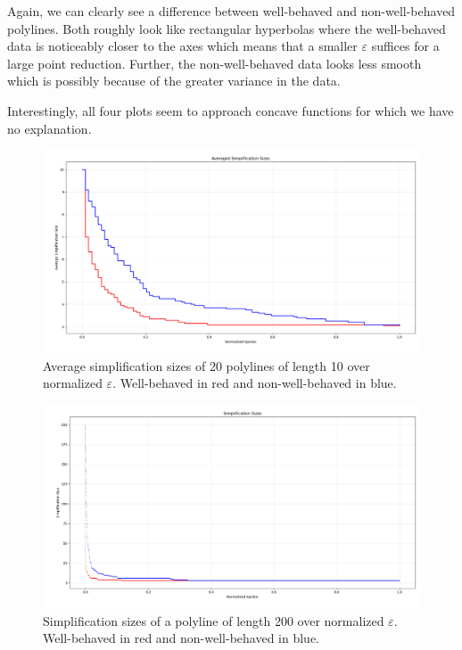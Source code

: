 Again, we can clearly see a difference between well-behaved and non-well-behaved polylines. Both roughly look like rectangular hyperbolas where the well-behaved data is noticeably closer to the axes which means that a smaller \(\varepsilon\) suffices for a large point reduction. Further, the non-well-behaved data looks less smooth which is possibly because of the greater variance in the data.

Interestingly, all four plots seem to approach concave functions for which we have no explanation.

\begin{figure}[b]
  \centering
	\includegraphics[scale=0.4]{./figures/vary_e10.png}
  \caption{Average simplification sizes of 20 polylines of length 10 over normalized \(\varepsilon\). Well-behaved in red and non-well-behaved in blue.}
  \label{fig:vary_e10}
\end{figure}

\begin{figure}[b]
  \centering
	\includegraphics[scale=0.4]{./figures/vary_e200.png}
  \caption{Simplification sizes of a polyline of length 200 over normalized \(\varepsilon\). Well-behaved in red and non-well-behaved in blue.}
  \label{fig:vary_e200}
\end{figure}

